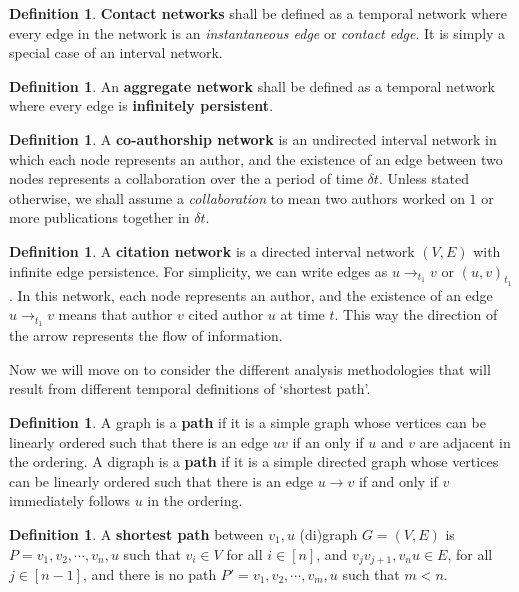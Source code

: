 \documentclass{article}
\theoremstyle{definition}
\newtheorem{defn}[thm]{Definition}
\numberwithin{thm}{subsection}
\begin{document}
\begin{defn}
  \textbf{Contact networks} shall be defined as a temporal network where
  every edge in the network is an \textit{instantaneous edge} or \textit{contact
  edge}. It is simply a special case of an interval network.
\end{defn}

\begin{defn}
  An \textbf{aggregate network} shall be defined as a temporal network where
  every edge is \textbf{infinitely persistent}.
\end{defn}

\begin{defn}
  A \textbf{co-authorship network} is an undirected interval network in which
  each node represents an author, and the existence of an edge between two nodes
  represents a collaboration over the a period of time $\delta t$. Unless stated
  otherwise, we shall assume a \textit{collaboration} to mean two authors worked
  on $1$ or more publications together in $\delta t$.
\end{defn}

\begin{defn}
  A \textbf{citation network} is a directed interval network $(V,E)$ with
  infinite edge persistence. For simplicity, we can write edges as $u \to_{t_1}
  v$ or $(u,v)_{t_1}$.  In this network, each node represents an author, and the
  existence of an edge $u \to_{t_1} v$ means that author $v$ cited author $u$
  at time $t$. This way the direction of the arrow represents the flow of
  information.
\end{defn}


Now we will move on to consider the different analysis methodologies that will
result from different temporal definitions of `shortest path'.

\begin{defn}
  A graph is a \textbf{path} if it is a simple graph whose vertices can be linearly
  ordered such that there is an edge $uv$ if an only if $u$ and $v$ are adjacent
  in the ordering.
  A digraph is a \textbf{path} if it is a simple directed graph whose vertices
  can be linearly ordered such that there is an edge $u \to v$ if and only if
  $v$ immediately follows $u$ in the ordering.
\end{defn}

\begin{defn}
 A \textbf{shortest path} between $v_1, u$ (di)graph $G = (V,E)$ is
 $P = v_1, v_2, \cdots, v_n, u$ such that $v_i \in V$ for all $i \in [n]$,
 and $v_jv_{j+1}, v_nu \in E$, for all $j \in [n-1]$, and there is no path
 $P' = v_1, v_2, \cdots, v_m, u$ such that $m < n$.
 \end{defn}
\end{document}
